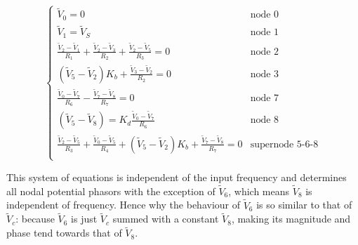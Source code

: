 \begin{equation}
  \begin{cases}
  \tilde{V}_0 = 0 & \mbox{node 0} \\
   \tilde{V}_1 = \tilde{V}_S & \mbox{node 1} \\
  \frac{\tilde{V}_2-\tilde{V}_1}{R_1}+\frac{\tilde{V}_2-\tilde{V}_3}{R_2}+\frac{\tilde{V}_2-\tilde{V}_5}{R_3} = 0 & \mbox{node 2} \\
  (\tilde{V}_5-\tilde{V}_2)K_b + \frac{\tilde{V}_3-\tilde{V}_2}{R_2} = 0 & \mbox{node 3} \\
  \frac{\tilde{V}_0-\tilde{V}_7}{R_6} - \frac{\tilde{V}_7-\tilde{V}_8}{R_7} = 0 & \mbox{node 7} \\
  (\tilde{V}_5-\tilde{V}_8) = K_d \frac{\tilde{V}_0-\tilde{V}_7}{R_6} & \mbox{node 8} \\
  \frac{\tilde{V}_2-\tilde{V}_5}{R_3} + \frac{\tilde{V}_0-\tilde{V}_5}{R_4} + (\tilde{V}_5-\tilde{V}_2)K_b + \frac{\tilde{V}_7-\tilde{V}_8}{R_7}  = 0 & \mbox{supernode 5-6-8} \\ 
  \end{cases}
\end{equation}

This system of equations is independent of the input frequency and determines all nodal potential phasors with the exception of $\tilde{V}_6$, which means $\tilde{V}_8$ is independent of frequency. Hence why the behaviour of $\tilde{V}_6$ is so similar to that of $\tilde{V}_c$: because $\tilde{V}_6$ is just $\tilde{V}_c$ summed with a constant $\tilde{V}_8$, making its magnitude and phase tend towards that of $\tilde{V}_8$.




